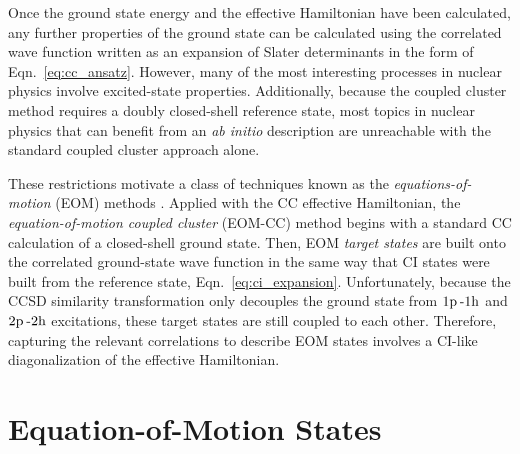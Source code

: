 \documentclass[thesis.tex]{subfiles}
\begin{document}
Once the ground state energy and the effective Hamiltonian have been calculated, any further properties of the ground state can be calculated using the correlated wave function written as an expansion of Slater determinants in the form of Eqn.\ \eqref{eq:cc_ansatz}.  However, many of the most interesting processes in nuclear physics involve excited-state properties.  Additionally, because the coupled cluster method requires a doubly closed-shell reference state, most topics in nuclear physics that can benefit from an \emph{ab initio} description are unreachable with the standard coupled cluster approach alone.

These restrictions motivate a class of techniques known as the \textit{equations-of-motion} (EOM) methods \cite{ROWE1968}.  Applied with the CC effective Hamiltonian, the \textit{equation-of-motion coupled cluster} (EOM-CC) method begins with a standard CC calculation of a closed-shell ground state.  Then, EOM \textit{target states} are built onto the correlated ground-state wave function in the same way that CI states were built from the reference state, Eqn.\ \eqref{eq:ci_expansion}.  Unfortunately, because the CCSD similarity transformation only decouples the ground state from $1\mathrm{p}\hspace{2pt}\text{-}1\mathrm{h}$ and $2\mathrm{p}\hspace{2pt}\text{-}2\mathrm{h}$ excitations, these target states are still coupled to each other.  Therefore, capturing the relevant correlations to describe EOM states involves a CI-like diagonalization of the effective Hamiltonian.


\section{Equation-of-Motion States} \label{section:eom_target_states}
\end{document}
